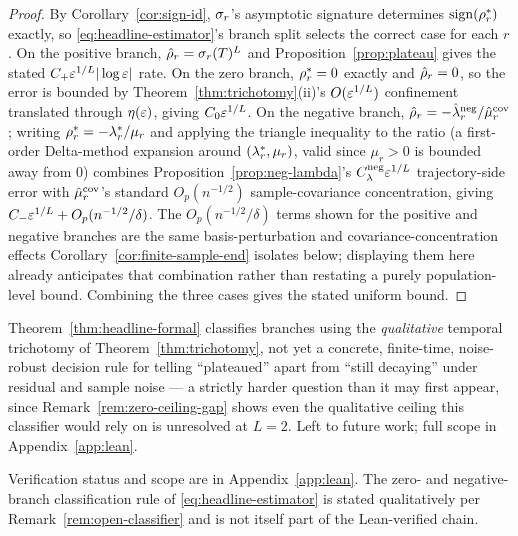 \begin{proof}
By Corollary~\ref{cor:sign-id}, $\sigma_r$'s asymptotic signature determines
$\operatorname{sign}(\rho_r^*)$ exactly, so \eqref{eq:headline-estimator}'s branch split
selects the correct case for each $r$. On the positive branch,
$\hat{\rho}_r = \sigma_r(T)^L$ and Proposition~\ref{prop:plateau} gives the
stated $C_+\varepsilon^{1/L}|\log\varepsilon|$ rate. On the zero branch, $\rho_r^*=0$
exactly and $\hat{\rho}_r=0$, so the error is bounded by
Theorem~\ref{thm:trichotomy}(ii)'s $O(\varepsilon^{1/L})$ confinement translated
through $\eta(\varepsilon)$, giving $C_0\varepsilon^{1/L}$. On the negative branch,
$\hat{\rho}_r = -\hat{\lambda}_r^{\mathrm{neg}}/\hat{\mu}_r^{\mathrm{cov}}$; writing
$\rho_r^* = -\lambda_r^*/\mu_r$ and applying the triangle inequality to the
ratio (a first-order Delta-method expansion around $(\lambda_r^*,\mu_r)$,
valid since $\mu_r>0$ is bounded away from $0$) combines
Proposition~\ref{prop:neg-lambda}'s $C_\lambda^{\mathrm{neg}}\varepsilon^{1/L}$
trajectory-side error with $\hat{\mu}_r^{\mathrm{cov}}$'s standard
$O_p(n^{-1/2})$ sample-covariance concentration, giving
$C_-\varepsilon^{1/L} + O_p(n^{-1/2}/\delta)$. The $O_p(n^{-1/2}/\delta)$ terms
shown for the positive and negative branches are the same
basis-perturbation and covariance-concentration effects
Corollary~\ref{cor:finite-sample-end} isolates below; displaying them
here already anticipates that combination rather than restating a
purely population-level bound. Combining the three cases gives the
stated uniform bound.
\end{proof}

\begin{remark}
\label{rem:open-classifier}
Theorem~\ref{thm:headline-formal} classifies branches using the \emph{qualitative}
temporal trichotomy of Theorem~\ref{thm:trichotomy}, not yet a concrete, finite-time,
noise-robust decision rule for telling ``plateaued'' apart from ``still decaying'' under
residual and sample noise --- a strictly harder question than it may first appear,
since Remark~\ref{rem:zero-ceiling-gap} shows even the qualitative ceiling this
classifier would rely on is unresolved at $L=2$. Left to future work; full scope in
Appendix~\ref{app:lean}.
\end{remark}

Verification status and scope are in Appendix~\ref{app:lean}. The zero- and
negative-branch classification rule of \eqref{eq:headline-estimator} is stated
qualitatively per Remark~\ref{rem:open-classifier} and is not itself part of the
Lean-verified chain.

